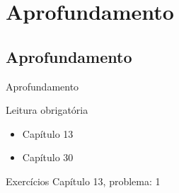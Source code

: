 \documentclass{beamer}
\begin{document}
\section{Aprofundamento}

\subsection{Aprofundamento}

\begin{frame}{Aprofundamento}
  \begin{block}{Leitura obrigatória}
    \begin{itemize}
    \item Capítulo 13
    \item Capítulo 30
    \end{itemize}
  \end{block}
  \begin{block}{Exercícios}
    Capítulo 13, problema: 1
  \end{block}
\end{frame}
\end{document}
